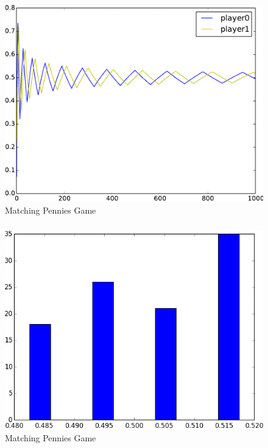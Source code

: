 \documentclass[dvipdfmx,fleqn]{beamer}
\begin{document}
\begin{frame}
\frametitle{}
\begin{figure}
 \centering
 \includegraphics[scale=0.58, bb=-250 -200 250 200]{fictitious_graph1.0.pdf}
 \caption{Matching Pennies Game}
 \label{fig:matchingpennies_plot}
\end{figure}
\end{frame}

\begin{frame}
\frametitle{}
\begin{figure}
 \centering
 \includegraphics[scale=0.58, bb=-250 -200 250 200]{fictitious_histo1.0.png}
 \caption{Matching Pennies Game}
 \label{fig:matchingpennies_histo}
\end{figure}
\end{frame}
\end{document}
